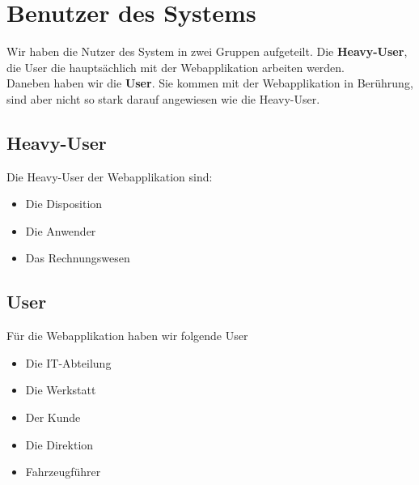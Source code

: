 \section{Benutzer des Systems}
Wir haben die Nutzer des System in zwei Gruppen aufgeteilt. Die \textbf{Heavy-User}, die User die hauptsächlich mit der Webapplikation arbeiten werden.\\
Daneben haben wir die \textbf{User}. Sie kommen mit der Webapplikation in Berührung, sind aber nicht so stark darauf angewiesen wie die Heavy-User.
%
\subsection{Heavy-User}
Die Heavy-User der Webapplikation sind:
\begin{itemize}
\item Die Disposition
\item Die Anwender
\item Das Rechnungswesen
\end{itemize}
%
\subsection{User}
Für die Webapplikation haben wir folgende User
\begin{itemize}
\item Die IT-Abteilung
\item Die Werkstatt
\item Der Kunde
\item Die Direktion
\item Fahrzeugführer
\end{itemize}
